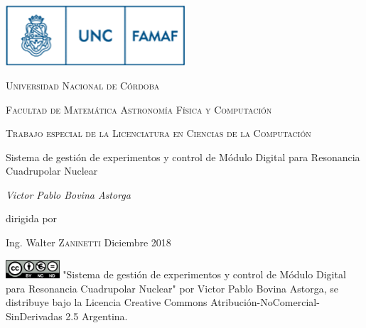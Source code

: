 

\begin{titlepage}
	\centering
	\includegraphics[width=0.50\textwidth]{../figures/famaf-logo.png}\par\vspace{1cm}
    {\scshape\LARGE Universidad Nacional de C\'ordoba \par}
    {\scshape\LARGE Facultad de Matem\'atica Astronom\'ia F\'isica y Computaci\'on \par}
	\vspace{1cm}
	{\scshape\Large Trabajo especial de la Licenciatura en
    Ciencias de la Computaci\'on\par}
	\vspace{1.5cm}
	{\huge Sistema de gesti\'on de experimentos y control de M\'odulo Digital para Resonancia Cuadrupolar Nuclear\par}
	\vspace{2cm}
	{\Large\itshape Victor Pablo Bovina Astorga\par}
	\vfill
    dirigida por \par 
    Ing. Walter \textsc{Zaninetti}
    \vfill
    Diciembre 2018
    \vfill

\includegraphics[width=0.15\textwidth]{../figures/cc.png}
\vfill
{\tiny "Sistema de gesti\'on de experimentos y control de M\'odulo Digital para Resonancia Cuadrupolar Nuclear" por Victor Pablo Bovina Astorga, se distribuye bajo la Licencia Creative Commons
Atribución-NoComercial-SinDerivadas 2.5 Argentina.}
\end{titlepage}
